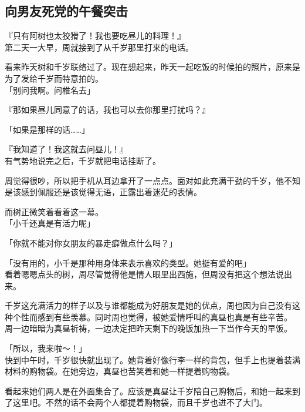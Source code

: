 \subsection{向男友死党的午餐突击}

『只有阿树也太狡猾了！我也要吃昼儿的料理！』\\

第二天一大早，周就接到了从千岁那里打来的电话。

看来昨天树和千岁联络过了。现在想起来，昨天一起吃饭的时候拍的照片，原来是为了发给千岁而特意拍的。\\

「别问我啊。问椎名去」

『那如果昼儿同意了的话，我也可以去你那里打扰吗？』

「如果是那样的话……」

『我知道了！我这就去问昼儿！』\\

有气势地说完之后，千岁就把电话挂断了。

周觉得很吵，所以把手机从耳边拿开了一点点。面对如此充满干劲的千岁，他不知是该感到佩服还是该觉得无语，正露出着迷茫的表情。

而树正微笑着看着这一幕。\\

「小千还真是有活力呢」

「你就不能对你女朋友的暴走癖做点什么吗？」

「没有用的，小千是那种用身体来表示喜欢的类型。她挺有爱的吧」\\

看着嗯嗯点头的树，周尽管觉得他是情人眼里出西施，但周没有把这个想法说出来。

千岁这充满活力的样子以及与谁都能成为好朋友是她的优点，周也因为自己没有这种个性而感到有些羡慕。同时周也觉得，被她爱情呼叫的真昼也真是有些辛苦。\\

周一边暗暗为真昼祈祷，一边决定把昨天剩下的晚饭加热一下当作今天的早饭。\\

\vspace{2\baselineskip}

「所以，我来啦～！」\\

快到中午时，千岁很快就出现了。她背着好像行李一样的背包，但手上也提着装满材料的购物袋。在她旁边，真昼也苦笑着和她一样提着购物袋。

看起来她们两人是在外面集合了。应该是真昼让千岁陪自己购物后，和她一起来到了这里吧。不然的话不会两个人都提着购物袋，而且千岁也进不了大门。\\

